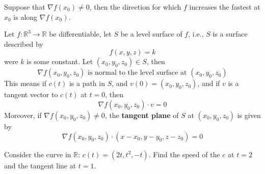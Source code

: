 \documentclass[openany]{book}
\newcommand{\R}{\mathbb{R}}
\begin{document}
\begin{prop}
    Suppose that $\nabla f(x_0)\neq 0$, then the direction for which $f$ increases the fastest at $x_0$ is along $\nabla f(x_0)$.
\end{prop}


\begin{prop}
    Let $f:\R^3\to\R$ be differentiable, let $S$ be a level surface of $f$, i.e., $S$ is a surface described by 
    \begin{equation*}
        f(x,y,z)=k
    \end{equation*}
    were $k$ is some constant. Let $(x_0,y_0,z_0)\in S$, then
    \begin{equation*}
        \nabla f(x_0,y_0,z_0) \text{ is normal to the level surface at } (x_0,y_0,z_0)
    \end{equation*}
    This means if $c(t)$ is a path in $S$, and $v(0)=(x_0,y_0,z_0)$, and if $v$ is a tangent vector to $c(t)$ at $t=0$, then 
    \begin{equation*}
        \nabla f(x_0,y_0, z_0)\cdot v=0
    \end{equation*}
    Moreover, if $\nabla f(x_0,y_0,z_0)\neq 0$, the \textbf{tangent plane} of $S$ at $(x_0,y_0,z_0)$ is given by 
    \begin{equation*}
        \nabla f(x_0,y_0,z_0)\cdot (x-x_0, y-y_0, z-z_0)=0
    \end{equation*}
\end{prop}










\begin{prob}
    Consider the curve in $\R$: $c(t)=(2t, t^2,-t)$. Find the speed of the $c$ at $t=2$ and the tangent line at $t=1$.
\end{prob}
\end{document}
